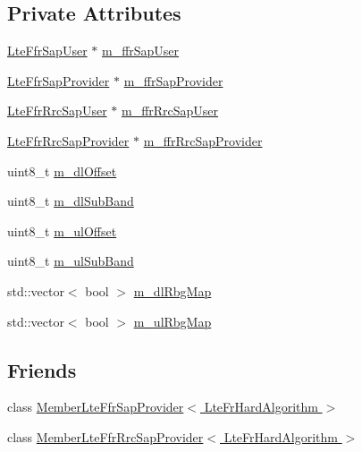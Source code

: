 \subsection*{Private Attributes}
\begin{DoxyCompactItemize}
\item 
\hyperlink{classns3_1_1LteFfrSapUser}{Lte\+Ffr\+Sap\+User} $\ast$ \hyperlink{classns3_1_1LteFrHardAlgorithm_a90194d05202677565aecc3ac2890cfb0}{m\+\_\+ffr\+Sap\+User}
\item 
\hyperlink{classns3_1_1LteFfrSapProvider}{Lte\+Ffr\+Sap\+Provider} $\ast$ \hyperlink{classns3_1_1LteFrHardAlgorithm_a1b4e15ae6cd933b0dfb3a6b2b6f2b71e}{m\+\_\+ffr\+Sap\+Provider}
\item 
\hyperlink{classns3_1_1LteFfrRrcSapUser}{Lte\+Ffr\+Rrc\+Sap\+User} $\ast$ \hyperlink{classns3_1_1LteFrHardAlgorithm_ab07a06db629c90dc51dee18c820bb495}{m\+\_\+ffr\+Rrc\+Sap\+User}
\item 
\hyperlink{classns3_1_1LteFfrRrcSapProvider}{Lte\+Ffr\+Rrc\+Sap\+Provider} $\ast$ \hyperlink{classns3_1_1LteFrHardAlgorithm_ac4ca442da740a310f7e131f20e92427b}{m\+\_\+ffr\+Rrc\+Sap\+Provider}
\item 
uint8\+\_\+t \hyperlink{classns3_1_1LteFrHardAlgorithm_a4189313310794f302ed782b27a599c9e}{m\+\_\+dl\+Offset}
\item 
uint8\+\_\+t \hyperlink{classns3_1_1LteFrHardAlgorithm_ad85b73b64bab9bbfa4fb048497fc5fc6}{m\+\_\+dl\+Sub\+Band}
\item 
uint8\+\_\+t \hyperlink{classns3_1_1LteFrHardAlgorithm_aeb34fed1ca8ef811d999252782159bf7}{m\+\_\+ul\+Offset}
\item 
uint8\+\_\+t \hyperlink{classns3_1_1LteFrHardAlgorithm_a70f1cda5f3524263e8718771c1233751}{m\+\_\+ul\+Sub\+Band}
\item 
std\+::vector$<$ bool $>$ \hyperlink{classns3_1_1LteFrHardAlgorithm_a15228bcacbb2da9605dcfe1cffd8731d}{m\+\_\+dl\+Rbg\+Map}
\item 
std\+::vector$<$ bool $>$ \hyperlink{classns3_1_1LteFrHardAlgorithm_ab121ab28a398ee8759b6b9f884c42c19}{m\+\_\+ul\+Rbg\+Map}
\end{DoxyCompactItemize}
\subsection*{Friends}
\begin{DoxyCompactItemize}
\item 
class \hyperlink{classns3_1_1LteFrHardAlgorithm_a3cc2b59e6cb06ab114d5a202602fa1dc}{Member\+Lte\+Ffr\+Sap\+Provider$<$ Lte\+Fr\+Hard\+Algorithm $>$}
\item 
class \hyperlink{classns3_1_1LteFrHardAlgorithm_a99444e761bbc6c4ca8cf527842905bcc}{Member\+Lte\+Ffr\+Rrc\+Sap\+Provider$<$ Lte\+Fr\+Hard\+Algorithm $>$}
\end{DoxyCompactItemize}
